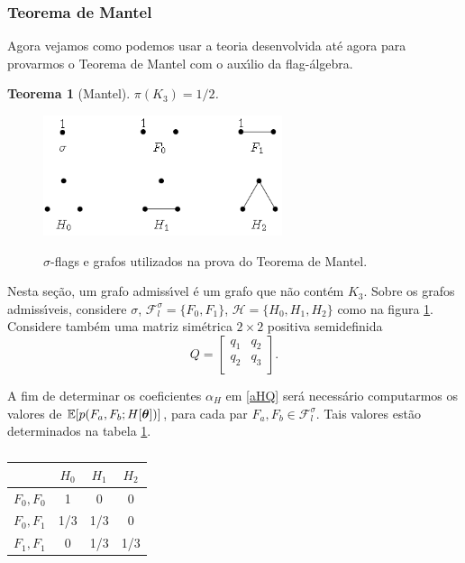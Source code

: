 \documentclass{amsart}
\theoremstyle{theorem}
\newtheorem{teorema}{Teorema}[section]
\theoremstyle{definition}
\theoremstyle{remark}
\numberwithin{equation}{section}
\newcommand{\E}[1]{\mathbb{E}[#1]}
\newcommand{\bt}{\mbox{\boldmath{$\theta$}}}
\begin{document}
\subsubsection{Teorema de Mantel}
Agora vejamos como podemos usar a teoria desenvolvida at\'{e} agora para provarmos o Teorema de Mantel com o aux\'{\i}lio da flag-\'{a}lgebra.

\begin{teorema}[Mantel]
  $\pi(K_3) = 1/2$.
\end{teorema}

\begin{figure}
  \includegraphics[width=7cm]{Figuras/fig2}\\
  \caption{$\sigma$-flags e grafos utilizados na prova do Teorema de Mantel.}\label{fig2}
\end{figure}

Nesta se\c{c}\~{a}o, um grafo admiss\'{\i}vel \'{e} um grafo que n\~{a}o cont\'{e}m $K_3$. Sobre os grafos admiss\'{\i}veis, considere $\sigma$, $\mathcal{F}^{\sigma}_{l} = \{ F_0,F_1 \}$, $\mathcal{H} = \{H_0,H_1,H_2\}$ como na figura \ref{fig2}. Considere tamb\'{e}m uma matriz sim\'{e}trica $2\times 2$ positiva semidefinida
\begin{equation*}
Q = \left[
  \begin{array}{cc}
    q_1 & q_2 \\
    q_2 & q_3 \\
  \end{array}
\right].
\end{equation*}

A fim de determinar os coeficientes $\alpha_{H}$ em \ref{aHQ} ser\'{a} necess\'{a}rio computarmos os valores de $\E{p(F_a,F_b;H[\bt])}$, para cada par $F_a,F_b \in \mathcal{F}_{l}^{\sigma}$. Tais valores est\~{a}o determinados na tabela \ref{tab2}.

\begin{table}
  \begin{tabular}{c|ccc}
                & $H_0$ & $H_1$ & $H_2$ \\ \hline
     $F_0,F_0$  & 1     & 0     & 0     \\
     $F_0,F_1$  & 1/3   & 1/3   & 0     \\
     $F_1,F_1$  & 0     & 1/3   & 1/3   \\
  \end{tabular}\caption{}\label{tab2}
\end{table}
\end{document}
